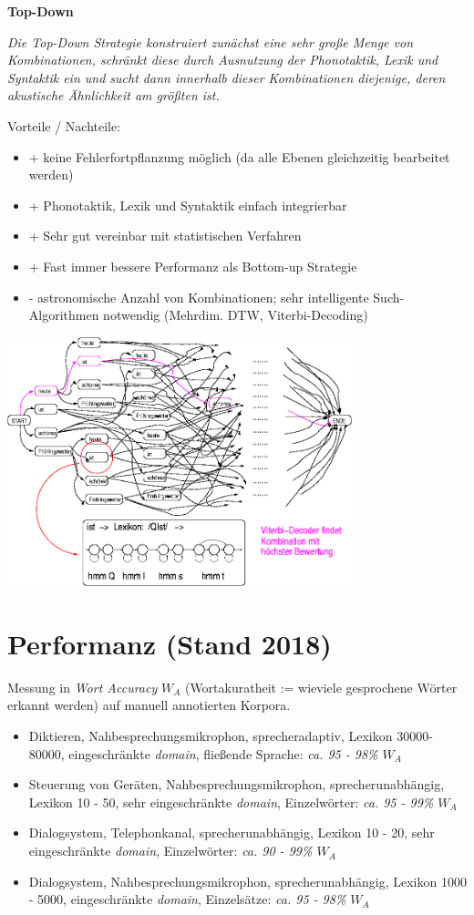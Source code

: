 \documentclass[11pt]{book}
\newcommand{\begi}{\begin{itemize} \setlength{\itemsep}{0.2cm}}
\newcommand{\ndit}{\end{itemize}}
\begin{document}
{\bf Top-Down}

{\em Die Top-Down Strategie konstruiert zunächst eine sehr große Menge
von Kombinationen, schränkt diese durch Ausnutzung der Phonotaktik, Lexik 
und Syntaktik ein und sucht dann innerhalb dieser Kombinationen diejenige,
deren akustische Ähnlichkeit am größten ist.}

Vorteile / Nachteile:
\begi
\item {+ keine Fehlerfortpflanzung möglich (da alle Ebenen gleichzeitig bearbeitet werden)}
\item {+ Phonotaktik, Lexik und Syntaktik einfach integrierbar}
\item {+ Sehr gut vereinbar mit statistischen Verfahren}
\item {+ Fast immer bessere Performanz als Bottom-up Strategie}
\item {- astronomische Anzahl von Kombinationen; sehr intelligente Such-Algorithmen notwendig (Mehrdim. DTW, Viterbi-Decoding)}
\ndit

\centerline{\includegraphics[width=10cm]{grafiken/automatische-spracherkennung/top.png}}

\section{Performanz (Stand 2018)}
Messung in {\em Wort Accuracy} $W_A$ (Wortakuratheit := wieviele gesprochene Wörter erkannt werden) 
auf manuell annotierten Korpora.
\begi
\item Diktieren, Nahbesprechungsmikrophon, sprecheradaptiv, Lexikon 30000-80000, 
eingeschränkte {\em domain}, fließende Sprache: {\em ca. 95 - 98\% $W_A$}
\item Steuerung von Geräten, Nahbesprechungsmikrophon, sprecherunabhängig, Lexikon 10 - 50, 
sehr eingeschränkte {\em domain}, Einzelwörter: {\em ca. 95 - 99\% $W_A$}
\item Dialogsystem, Telephonkanal, sprecherunabhängig, Lexikon 10 - 20, 
sehr eingeschränkte {\em domain}, Einzelwörter: {\em ca. 90 - 99\% $W_A$}
\item Dialogsystem, Nahbesprechungsmikrophon, sprecherunabhängig, Lexikon 1000 - 5000, 
eingeschränkte {\em domain}, Einzelsätze: {\em ca. 95 - 98\% $W_A$}
\ndit
\end{document}
